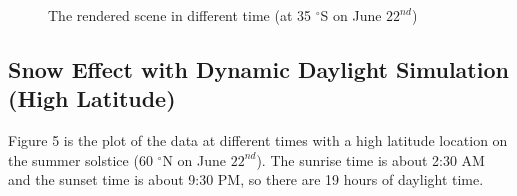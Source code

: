 \documentclass{article}
\begin{document}
\begin{figure}[h]

  \caption{The rendered scene in different time (at 35 $^{\circ}$S on June \(22^{nd}\))}
  \label{fig:L35S}
\end{figure}

\subsection {Snow Effect with Dynamic Daylight Simulation (High Latitude)}

Figure 5 is the plot of the data at different times with a high latitude location on the summer solstice (60 $^{\circ}$N on June 
\(22^{nd}\)). The sunrise time is about 2:30 AM and the sunset time is about 9:30 PM, so there are 19 hours of daylight time.
\end{document}

